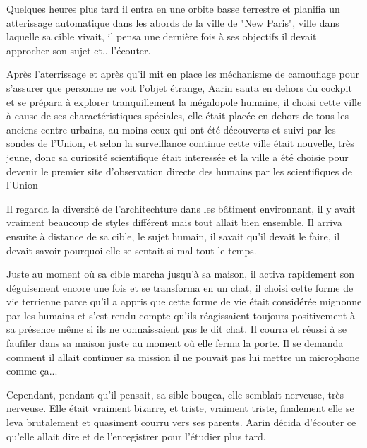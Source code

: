 \documentclass[12pt,colorlinks,a4paper]{book}
\begin{document}
Quelques heures plus tard il entra en une orbite basse terrestre et planifia un atterissage automatique dans les 
abords de la ville de "New Paris", ville dans laquelle sa cible vivait, il pensa une dernière fois à ses objectifs
il devait approcher son sujet et.. l'écouter.\par 
\bigskip

Après l'aterrissage et après qu'il mit en place les méchanisme de camouflage pour s'assurer que personne ne voit 
l'objet étrange, Aarin sauta en dehors du cockpit et se prépara à explorer tranquillement la mégalopole humaine,
il choisi cette ville à cause de ses charactéristiques spéciales, elle était placée en dehors de tous les anciens 
centre urbains, au moins ceux qui ont été découverts et suivi par les sondes de l'Union, et selon la 
surveillance continue cette ville était nouvelle, très jeune, donc sa curiosité scientifique était interessée
et la ville a été choisie pour devenir le premier site d'observation directe des humains par les scientifiques de l'Union\par 
\bigskip

Il regarda la diversité de l'architechture dans les bâtiment environnant, il y avait vraiment beaucoup de styles 
différent mais tout allait bien ensemble. Il arriva ensuite à distance de sa cible, le sujet humain, 
il savait qu'il devait le faire, il devait savoir pourquoi elle se sentait si mal tout le temps.\par 
\bigskip

Juste au moment où sa cible marcha jusqu'à sa maison, il activa rapidement son déguisement encore une fois et 
se transforma en un chat, il choisi cette forme de vie terrienne parce qu'il a appris que cette forme de vie était 
considérée mignonne par les humains et s'est rendu compte qu'ils réagissaient toujours positivement à sa présence même si ils 
ne connaissaient pas le dit chat. Il courra et réussi à se faufiler dans sa maison juste au moment où elle ferma la porte.
Il se demanda comment il allait continuer sa mission il ne pouvait pas lui mettre un microphone comme ça...\par 
\bigskip

Cependant, pendant qu'il pensait, sa sible bougea, elle semblait nerveuse, très nerveuse.
Elle était vraiment bizarre, et triste, vraiment triste, finalement elle se leva brutalement 
et quasiment courru vers ses parents. Aarin décida d'écouter ce qu'elle allait dire et de l'enregistrer pour 
l'étudier plus tard.\par 
\bigskip
\end{document}
